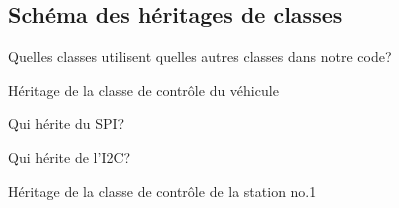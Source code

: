 \begin{figure}[hbtp]
\subsection{Schéma des héritages de classes}
Quelles classes utilisent quelles autres classes dans notre code?
\caption{Héritage de la classe de contrôle du véhicule}
\centering
{}
\caption{Qui hérite du SPI?}
\caption{Qui hérite de l'I2C?}
\caption{Héritage de la classe de contrôle de la station no.1}
\end{figure}